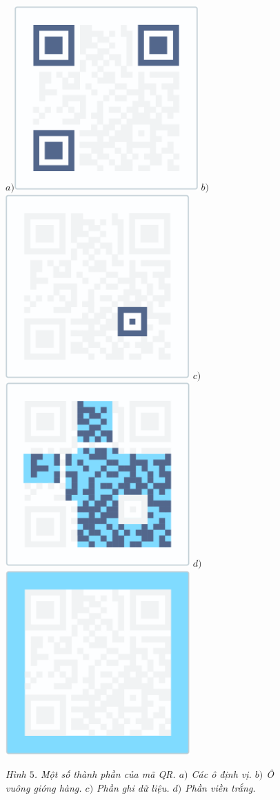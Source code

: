 \begin{multicols}{2}
	\begin{figure}[H]
		\vspace*{-10pt}
		\centering
		\captionsetup{labelformat= empty, justification=centering}
		$a)$\includegraphics[height=0.38\linewidth]{7}
		$b)$\includegraphics[height=0.38\linewidth]{8}
		$c)$\includegraphics[height=0.38\linewidth]{9}
		$d)$\includegraphics[height=0.38\linewidth]{10}
		\caption{\small\textit{\color{toanhocdoisong}Hình $5$. Một số thành phần của mã QR. $a)$ Các ô định vị. $b)$ Ô vuông gióng hàng. $c)$ Phần ghi dữ liệu. $d)$ Phần viền trắng.}}

\end{figure}
\end{multicols}
